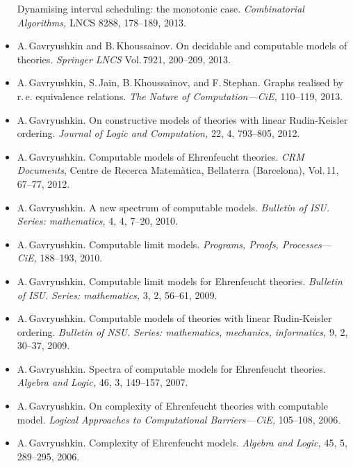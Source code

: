 \documentclass[12pt]{article}
\begin{document}
\begin{itemize}
	Dynamising interval scheduling: the monotonic case. {\em Combinatorial Algorithms,}
	LNCS 8288, 178--189, 2013. 
\item A.\,Gavryushkin and B.\,Khoussainov. On decidable and computable 
	models of theories. 
	{\em Springer LNCS} Vol.\,7921, 200--209, 2013.
\item A.\,Gavryushkin, S.\,Jain, B.\,Khoussainov, and F.\,Stephan. 
	Graphs realised by r.\,e. equivalence relations. 
	{\em The Nature of Computation---CiE,} 
	110--119, 2013.	
\item A.\,Gavryushkin. On constructive models of theories with linear 
	Rudin-Keisler ordering. 
	{\em Journal of Logic and Computation,} 
	22, 4, 793--805, 2012.
\item A.\,Gavryushkin. Computable models of Ehrenfeucht theories. 
	{\em CRM Documents}, Centre de Recerca Matem\` atica, 
	Bellaterra (Barcelona), Vol.\,11, 67--77, 2012.
\item A.\,Gavryushkin. A new spectrum of computable models. 
	{\em Bulletin of ISU. Series: mathematics,} 4, 4, 7--20, 2010.
\item A.\,Gavryushkin. Computable limit models. 
	{\em Programs, Proofs, Processes---CiE,} 188--193, 2010.
\item A.\,Gavryushkin. Computable limit models for Ehrenfeucht theories. 
	{\em Bulletin of ISU. Series: mathematics,} 3, 2, 56--61, 2009.
\item A.\,Gavryushkin. Computable models of theories with linear 
	Rudin-Keisler ordering. 
	{\em Bulletin of NSU. Series: mathematics, mechanics, 
	informatics,} 9, 2, 30--37, 2009. 
\item A.\,Gavryushkin. Spectra of computable models for 
	Ehrenfeucht theories.
	{\em Algebra and Logic,} 46, 3, 149--157, 2007.
\item A.\,Gavryushkin. On complexity of Ehrenfeucht theories 
	with computable model. 
	{\em Logical Approaches to Computational Barriers---CiE,} 
	105--108, 2006.
\item A.\,Gavryushkin. Complexity of Ehrenfeucht models. {\em Algebra 
	and Logic,} 45, 5, 289--295, 2006. 
\end{itemize}
\end{document}
